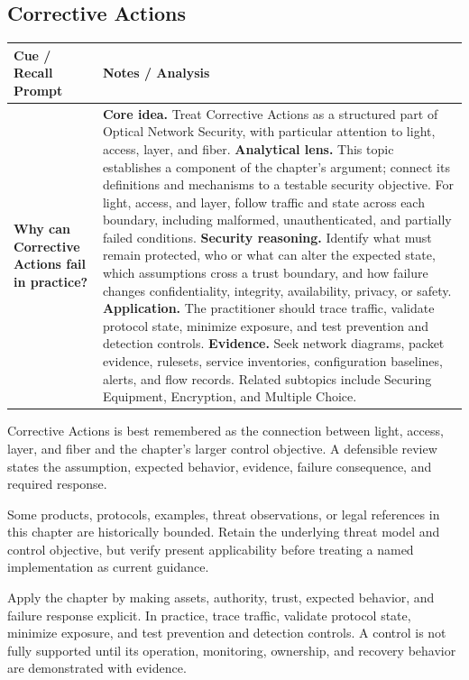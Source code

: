 \documentclass[11pt]{article}
\newcommand{\CornellHeader}{%
\rowcolor{Navy}\color{white}\bfseries Cue / Recall Prompt & \color{white}\bfseries Notes / Analysis\\\hline}
\newcommand{\CornellRow}[2]{%
\cellcolor{CueGray}\RaggedRight\textbf{#1} & \RaggedRight #2\\\hline}
\begin{document}
\subsection*{Corrective Actions}
\begin{longtable}{>{\RaggedRight\arraybackslash}p{}|>{\RaggedRight\arraybackslash}p{}}
\CornellHeader
\CornellRow{Why can Corrective Actions fail in practice?}{\textbf{Core idea.} Treat Corrective Actions as a structured part of Optical Network Security, with particular attention to light, access, layer, and fiber. \textbf{Analytical lens.} This topic establishes a component of the chapter's argument; connect its definitions and mechanisms to a testable security objective. For light, access, and layer, follow traffic and state across each boundary, including malformed, unauthenticated, and partially failed conditions. \textbf{Security reasoning.} Identify what must remain protected, who or what can alter the expected state, which assumptions cross a trust boundary, and how failure changes confidentiality, integrity, availability, privacy, or safety. \textbf{Application.} The practitioner should trace traffic, validate protocol state, minimize exposure, and test prevention and detection controls. \textbf{Evidence.} Seek network diagrams, packet evidence, rulesets, service inventories, configuration baselines, alerts, and flow records. Related subtopics include Securing Equipment, Encryption, and Multiple Choice.}
\end{longtable}
\begin{topicsummary}
Corrective Actions is best remembered as the connection between light, access, layer, and fiber and the chapter's larger control objective. A defensible review states the assumption, expected behavior, evidence, failure consequence, and required response.
\end{topicsummary}
\begin{historybox}
Some products, protocols, examples, threat observations, or legal references in this chapter are historically bounded. Retain the underlying threat model and control objective, but verify present applicability before treating a named implementation as current guidance.
\end{historybox}
\begin{defensebox}
Apply the chapter by making assets, authority, trust, expected behavior, and failure response explicit. In practice, trace traffic, validate protocol state, minimize exposure, and test prevention and detection controls. A control is not fully supported until its operation, monitoring, ownership, and recovery behavior are demonstrated with evidence.
\end{defensebox}
\end{document}
